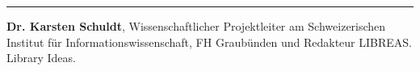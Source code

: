 \begin{center}\rule{0.5\linewidth}{0.5pt}\end{center}

\textbf{Dr. Karsten Schuldt}, Wissenschaftlicher Projektleiter am Schweizerischen Institut für Informationswissenschaft, FH Graubünden und Redakteur LIBREAS. Library Ideas.